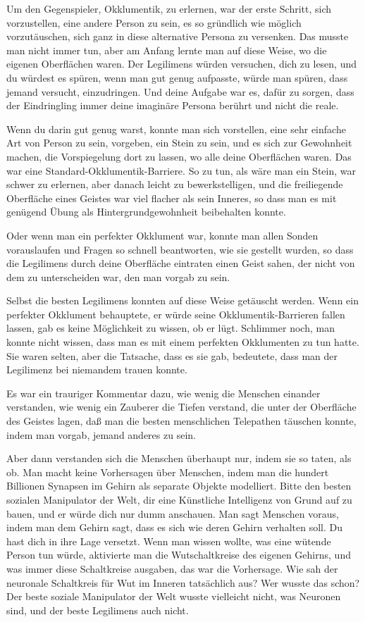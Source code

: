 Um den Gegenspieler, Okklumentik, zu erlernen, war der erste Schritt, sich
vorzustellen, eine andere Person zu sein, es so gründlich wie möglich
vorzutäuschen, sich ganz in diese alternative Persona zu versenken. Das musste
man nicht immer tun, aber am Anfang lernte man auf diese Weise, wo die eigenen
Oberflächen waren. Der Legilimens würden versuchen, dich zu lesen, und du
würdest es spüren, wenn man gut genug aufpasste, würde man spüren, dass jemand
versucht, einzudringen. Und deine Aufgabe war es, dafür zu sorgen, dass der
Eindringling immer deine imaginäre Persona berührt und nicht die reale.

Wenn du darin gut genug warst, konnte man sich vorstellen, eine sehr einfache
Art von Person zu sein, vorgeben, ein Stein zu sein, und es sich zur Gewohnheit
machen, die Vorspiegelung dort zu lassen, wo alle deine Oberflächen waren. Das
war eine Standard-Okklumentik-Barriere. So zu tun, als wäre man ein Stein, war
schwer zu erlernen, aber danach leicht zu bewerkstelligen, und die freiliegende
Oberfläche eines Geistes war viel flacher als sein Inneres, so dass man es mit
genügend Übung als Hintergrundgewohnheit beibehalten konnte.

Oder wenn man ein perfekter Okklument war, konnte man allen Sonden vorauslaufen
und Fragen so schnell beantworten, wie sie gestellt wurden, so dass die
Legilimens durch deine Oberfläche eintraten einen Geist sahen, der nicht von dem
zu unterscheiden war, den man vorgab zu sein.

Selbst die besten Legilimens konnten auf diese Weise getäuscht werden. Wenn ein
perfekter Okklument behauptete, er würde seine Okklumentik-Barrieren fallen
lassen, gab es keine Möglichkeit zu wissen, ob er lügt. Schlimmer noch, man
konnte nicht wissen, dass man es mit einem perfekten Okklumenten zu tun hatte.
Sie waren selten, aber die Tatsache, dass es sie gab, bedeutete, dass man der
Legilimenz bei niemandem trauen konnte.

Es war ein trauriger Kommentar dazu, wie wenig die Menschen einander verstanden,
wie wenig ein Zauberer die Tiefen verstand, die unter der Oberfläche des Geistes
lagen, daß man die besten menschlichen Telepathen täuschen konnte, indem man
vorgab, jemand anderes zu sein.

Aber dann verstanden sich die Menschen überhaupt nur, indem sie so taten, als
ob. Man macht keine Vorhersagen über Menschen, indem man die hundert Billionen
Synapsen im Gehirn als separate Objekte modelliert. Bitte den besten sozialen
Manipulator der Welt, dir eine Künstliche Intelligenz von Grund auf zu bauen,
und er würde dich nur dumm anschauen. Man sagt Menschen voraus, indem man dem
Gehirn sagt, dass es sich wie deren Gehirn verhalten soll. Du hast dich in ihre
Lage versetzt. Wenn man wissen wollte, was eine wütende Person tun würde,
aktivierte man die Wutschaltkreise des eigenen Gehirns, und was immer diese
Schaltkreise ausgaben, das war die Vorhersage. Wie sah der neuronale Schaltkreis
für Wut im Inneren tatsächlich aus? Wer wusste das schon? Der beste soziale
Manipulator der Welt wusste vielleicht nicht, was Neuronen sind, und der beste
Legilimens auch nicht.

